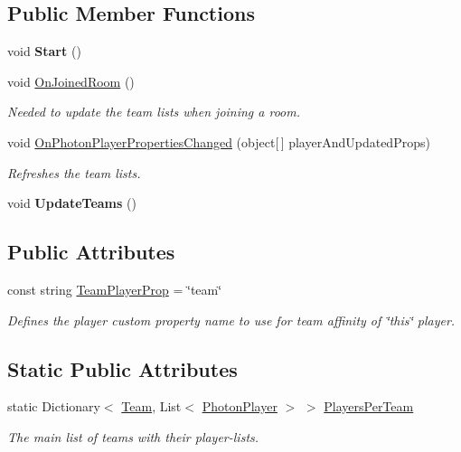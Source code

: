 \subsection*{Public Member Functions}
\begin{DoxyCompactItemize}
\item 
void {\bfseries Start} ()\hypertarget{class_pun_teams_a34a0c084356816754542a6299e5cad94}{}\label{class_pun_teams_a34a0c084356816754542a6299e5cad94}

\item 
void \hyperlink{class_pun_teams_a9b844f234f8c18f9336458f14c1e10d5}{On\+Joined\+Room} ()
\begin{DoxyCompactList}\small\item\em Needed to update the team lists when joining a room. \end{DoxyCompactList}\item 
void \hyperlink{class_pun_teams_a8478309a7c3a43014901f5ae2ed3ddc7}{On\+Photon\+Player\+Properties\+Changed} (object\mbox{[}$\,$\mbox{]} player\+And\+Updated\+Props)
\begin{DoxyCompactList}\small\item\em Refreshes the team lists. \end{DoxyCompactList}\item 
void {\bfseries Update\+Teams} ()\hypertarget{class_pun_teams_a03fd4ce6acb2bd7a4b02ac15858740a0}{}\label{class_pun_teams_a03fd4ce6acb2bd7a4b02ac15858740a0}

\end{DoxyCompactItemize}
\subsection*{Public Attributes}
\begin{DoxyCompactItemize}
\item 
const string \hyperlink{class_pun_teams_a036c6f1b595a3a4d3df5dc6566950667}{Team\+Player\+Prop} = \char`\"{}team\char`\"{}
\begin{DoxyCompactList}\small\item\em Defines the player custom property name to use for team affinity of \char`\"{}this\char`\"{} player.\end{DoxyCompactList}\end{DoxyCompactItemize}
\subsection*{Static Public Attributes}
\begin{DoxyCompactItemize}
\item 
static Dictionary$<$ \hyperlink{class_pun_teams_a933d84000474f43931805990b241a2a7}{Team}, List$<$ \hyperlink{class_photon_player}{Photon\+Player} $>$ $>$ \hyperlink{class_pun_teams_a96cd4b32e4cd5a4447c10f2a3f22a22a}{Players\+Per\+Team}
\begin{DoxyCompactList}\small\item\em The main list of teams with their player-\/lists. \end{DoxyCompactList}\end{DoxyCompactItemize}


